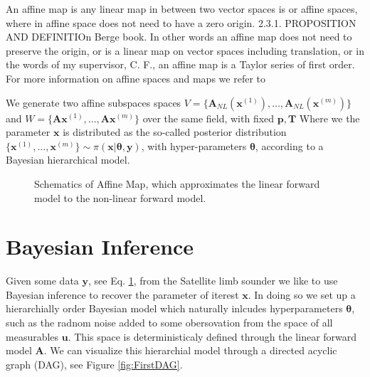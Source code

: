An affine map is any linear map in between two vector spaces is or affine spaces, where in affine space does not need to have a zero origin. 2.3.1. PROPOSITION AND DEFINITIOn Berge book\cite{}.
In other words an affine map does not need to preserve the origin, or is a linear map on vector spaces including translation, or in the words of my supervisor, C. F., an affine map is a Taylor series of first order.
For more information on affine spaces and maps we refer to \cite{two books}

We generate two affine subspaces spaces \newline $V = \big\{ \bm{A}_{NL}(\bm{x}^{(1)}), \dots ,\bm{A}_{NL}(\bm{x}^{(m)})\big\} $ and $W = \big\{ \bm{A}\bm{x}^{(1)}, \dots ,\bm{A}\bm{x}^{(m)}\big\}$ over the same field, with fixed $\bm{p,T}$
Where we the parameter $\bm{x}$ is distributed as the so-called posterior distribution $\big\{  \bm{x}^{(1)} , \dots, \bm{x}^{(m)} \big\} \sim \pi(\bm{x}|\bm{\theta},\bm{y})$, with hyper-parameters $\bm{\theta}$, according to a Bayesian hierarchical model.



\begin{figure}[ht!]
	\centering
	\caption[Schematics of Affine Map]{Schematics of Affine Map, which approximates the linear forward model to the non-linear forward model.}
\end{figure}

\section{Bayesian Inference}
Given some data $\bm{y}$, see Eq. \ref{}, from the Satellite limb sounder we like to use Bayesian inference to recover the parameter of iterest $\bm{x}$.
In doing so we set up a hierarchially order Bayesian model which naturally inlcudes hyperparameters $\bm{\theta}$, such as the radnom noise added to some obersovation from the space of all measurables $\bm{u}$.
This space is deterministicaly defined through the linear forward model $\bm{A}$.
We can visualize this hierarchial model through a directed acyclic graph (DAG), see Figure \ref{fig:FirstDAG}.

